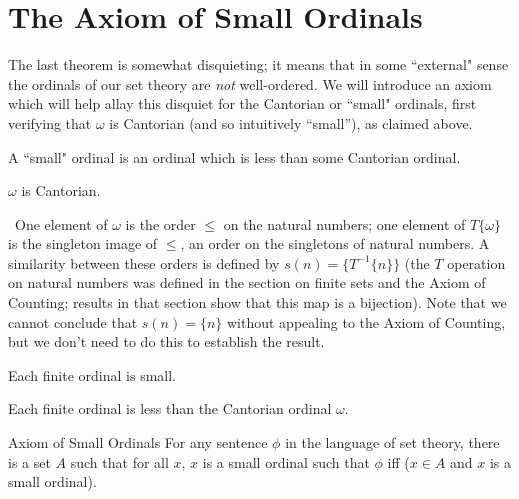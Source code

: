 \section{The Axiom of Small Ordinals}

The last theorem is somewhat disquieting; it means that in some
``external" sense the ordinals of our set theory are {\itshape not\/}
well-ordered.  We will introduce an axiom which will help
allay this disquiet for the Cantorian or ``small"
ordinals, first verifying that $\omega$ is Cantorian
(and so intuitively ``small''), as claimed above.

\begin{definition}
 A ``small" ordinal is an ordinal which is less than
 some Cantorian ordinal.
\end{definition}

\begin{thm}
 $\omega$ is Cantorian.
\end{thm}

\preuve\ One element of $\omega$ is the order $\leq$ on the
natural numbers; one element of $T\{\omega\}$ is the singleton image 
of $\leq$, an order on the singletons of natural numbers.  A
similarity between these orders is defined by $s(n) =
\{T^{-1}\{n\}\}$ (the $T$ operation on natural numbers was defined in the
section on finite sets and the Axiom of Counting; results in that section show that this map is a
bijection).  Note that we cannot conclude that $s(n) = \{n\}$
without appealing to the Axiom of Counting, but we don't need to do this to
establish the result.
\finpreuve

\begin{cor}
 Each finite ordinal is small.
\end{cor}

\preuve Each finite ordinal is less than the Cantorian
ordinal $\omega$.
\finpreuve

\begin{axiom}{Axiom of Small Ordinals}
 For any sentence $\phi$ in the
 language of set theory, there is a set $A$ such that
 for all $x$, $x$ is a small ordinal such that $\phi$ iff ($x\in A$ and
 $x$ is a small ordinal).
\end{axiom}


